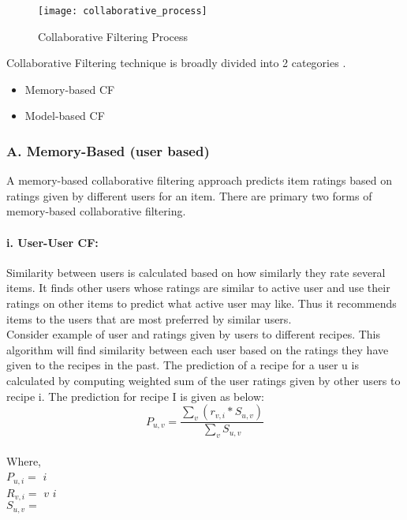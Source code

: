 \begin{figure}[H]
	\centering
	\texttt{[image: collaborative\_process]}
	\caption{Collaborative Filtering Process \cite{33}}
	\label{fig:collaborative_process}
\end{figure}


\noindent Collaborative Filtering technique is broadly divided into 2 categories \cite{11}. 
\\
\begin{itemize}
\item Memory-based CF
\item Model-based CF
\end{itemize}

\subsubsection{A. Memory-Based (user based)}
A memory-based collaborative filtering approach predicts item ratings based on ratings given by different users for an item. There are primary two forms of memory-based collaborative filtering.
\paragraph{i. User-User CF:} 

Similarity between users is calculated based on how similarly they rate several items. It finds other users whose ratings are similar to active user and use their ratings on other items to predict what active user may like. Thus it recommends items to the users that are most preferred by similar users.
\\
Consider example of user and ratings given by users to different recipes. This algorithm will find similarity between each user based on the ratings they have given to the recipes in the past. The prediction of a recipe for a user u is calculated by computing weighted sum of the user ratings given by other users to recipe i.
The prediction for recipe I is given as below:
\\
\begin{equation}
P_{u,v} = \frac { \sum_v(r_{v,i} * S_{u,v})}{\sum_v S_{u,v}}
\end{equation}
\\
Where, 
\\
\noindent
$P_{u,i} = $  $i$ 
\\
$R_{v,i} = $  $v$  $i$ 
\\
$S_{u,v} = $ 
\\

